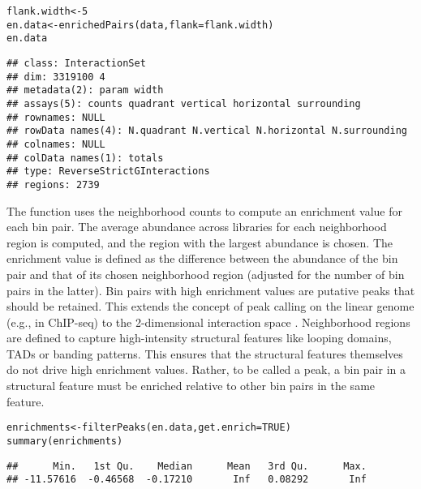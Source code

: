\documentclass{report}\usepackage[]{graphicx}\usepackage[usenames,dvipsnames]{color}
\newcommand{\hlnum}[1]{\textcolor[rgb]{0.816,0.125,0.439}{#1}}%
\newcommand{\hlstd}[1]{\textcolor[rgb]{0.251,0.251,0.251}{#1}}%
\newcommand{\hlkwb}[1]{\textcolor[rgb]{0,0,0}{#1}}%
\newcommand{\hlkwc}[1]{\textcolor[rgb]{0.251,0.251,0.251}{#1}}%
\newcommand{\hlkwd}[1]{\textcolor[rgb]{0.878,0.439,0.125}{#1}}%
\newenvironment{knitrout}{}{} %
\begin{document}
\begin{knitrout}
\color{fgcolor}\begin{kframe}
\begin{alltt}
\hlstd{flank.width} \hlkwb{<-} \hlnum{5}
\hlstd{en.data} \hlkwb{<-} \hlkwd{enrichedPairs}\hlstd{(data,} \hlkwc{flank}\hlstd{=flank.width)}
\hlstd{en.data}
\end{alltt}
\begin{verbatim}
## class: InteractionSet 
## dim: 3319100 4 
## metadata(2): param width
## assays(5): counts quadrant vertical horizontal surrounding
## rownames: NULL
## rowData names(4): N.quadrant N.vertical N.horizontal N.surrounding
## colnames: NULL
## colData names(1): totals
## type: ReverseStrictGInteractions
## regions: 2739
\end{verbatim}
\end{kframe}
\end{knitrout}

The  function uses the neighborhood counts to compute an enrichment value for each bin pair.
The average abundance across libraries for each neighborhood region is computed, and the region with the largest abundance is chosen.
The enrichment value is defined as the difference between the abundance of the bin pair and that of its chosen neighborhood region (adjusted for the number of bin pairs in the latter).
Bin pairs with high enrichment values are putative peaks that should be retained.
This extends the concept of peak calling on the linear genome (e.g., in ChIP-seq) to the 2-dimensional interaction space \cite{rao2014kilobase}.
Neighborhood regions are defined to capture high-intensity structural features like looping domains, TADs or banding patterns.
This ensures that the structural features themselves do not drive high enrichment values.
Rather, to be called a peak, a bin pair in a structural feature must be enriched relative to other bin pairs in the same feature.

\begin{knitrout}
\color{fgcolor}\begin{kframe}
\begin{alltt}
\hlstd{enrichments} \hlkwb{<-} \hlkwd{filterPeaks}\hlstd{(en.data,} \hlkwc{get.enrich}\hlstd{=}\hlnum{TRUE}\hlstd{)}
\hlkwd{summary}\hlstd{(enrichments)}
\end{alltt}
\begin{verbatim}
##      Min.   1st Qu.    Median      Mean   3rd Qu.      Max. 
## -11.57616  -0.46568  -0.17210       Inf   0.08292       Inf
\end{verbatim}
\end{kframe}
\end{knitrout}
\end{document}
